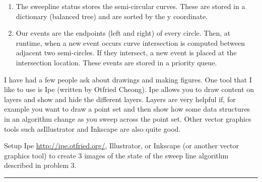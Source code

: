\documentclass[11pt]{article}
\begin{document}
\begin{enumerate}[(1)]
    \item The sweepline status stores the semi-circular curves.
        These are stored in a dictionary (balanced tree) and are sorted by the y coordinate.
    \item Our events are the endpoints (left and right) of every circle. 
    Then, at runtime, when a new event occurs curve intersection is computed between adjacent 
    two semi-circles. If they intersect, a new event is placed at the intersection location. 
    These events are stored in a priority queue. 
\end{enumerate}






I have had a few people ask about drawings and making figures.  One tool that I
like to use is Ipe (written by Otfried Cheong).  Ipe allows you to draw content
on layers and show and hide the different layers.  Layers are very helpful if,
for example you want to draw a point set and then show how some data structures
in an algorithm change as you sweep across the point set.
Other vector graphics tools such asIllustrator and Inkscape are also quite good.

Setup Ipe \url{http://ipe.otfried.org/}, Illustrator, or Inkscape
(or another vector graphics tool)
to create 3 images of the state of the sweep line algorithm
described in problem 3.

\hrule
\end{document}
